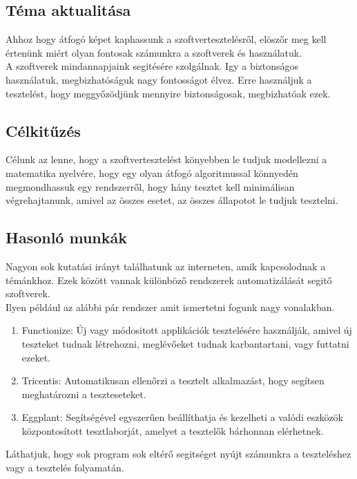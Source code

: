 \documentclass[12pt]{article}
\begin{document}
\subsection{Téma aktualitása}

Ahhoz hogy átfogó képet kaphassunk a szoftvertesztelésről, elöszőr meg kell értenünk miért olyan fontosak számunkra a szoftverek és használatuk.\\ 
A szoftverek mindannapjaink segitésére szolgálnak. Igy a biztonságos használatuk, megbizhatóságuk nagy fontosságot élvez. Erre használjuk a tesztelést, hogy meggyőzödjünk mennyire biztonságosak, megbizhatóak ezek.\\

\subsection{Célkitűzés}

Célunk az lenne, hogy a szoftvertesztelést könyebben le tudjuk modellezni a matematika nyelvére, hogy egy olyan átfogó algoritmussal könnyedén megmondhassuk egy rendszerről, hogy hány tesztet kell minimálisan végrehajtanunk, amivel az összes esetet, az összes állapotot le tudjuk tesztelni.

\subsection{Hasonló munkák}

Nagyon sok kutatási irányt találhatunk az interneten, amik kapcsolodnak a témánkhoz. Ezek között vannak különböző rendszerek automatizálását segitő szoftverek.\\
Ilyen például az alábbi pár rendszer amit ismertetni fogunk nagy vonalakban.

\begin{enumerate}
\item Functionize: Új vagy módositott applikációk tesztelésére használják, amivel új teszteket tudnak létrehozni, meglévőeket tudnak karbantartani, vagy futtatni ezeket. 
\item Tricentis: Automatikusan ellenőrzi a tesztelt alkalmazást, hogy segítsen meghatározni a teszteseteket.
\item Eggplant: Segítségével egyszerűen beállíthatja és kezelheti a valódi eszközök központosított tesztlaborját, amelyet a tesztelők bárhonnan elérhetnek.
\end{enumerate}

Láthatjuk, hogy sok program sok eltérő segitséget nyújt számunkra a teszteléshez vagy a tesztelés folyamatán.\\
\end{document}
